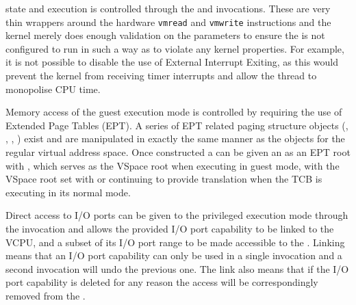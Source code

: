  state and execution is controlled through the 
and  invocations.
These are very thin wrappers around the hardware \texttt{vmread} and \texttt{vmwrite} instructions and the kernel
merely does enough validation on the parameters to ensure the  is not configured
to run in such a way as to violate any kernel properties. For example, it is not possible to
disable the use of External Interrupt Exiting, as this would prevent the kernel from receiving
timer interrupts and allow the thread to monopolise CPU time.

Memory access of the guest execution mode is controlled by requiring the use of Extended
Page Tables (EPT). A series of EPT related paging structure objects (, , , )
exist and are manipulated in exactly the same manner as the objects for the regular virtual
address space. Once constructed a  can be given an  as an EPT root with ,
which serves as the VSpace root when executing in guest mode, with the VSpace root set
with  or 
continuing to provide translation when the TCB is executing in its normal mode.

Direct access to I/O ports can be given to the privileged execution mode through the
 invocation and allows the provided I/O port capability to be
linked to the VCPU, and a subset of its I/O port range to be made accessible to the .
Linking means that an I/O port capability can only be used in a single 
invocation and a second invocation will undo the previous one. The link also means that
if the I/O port capability is deleted for any reason the access will be correspondingly removed
from the .
